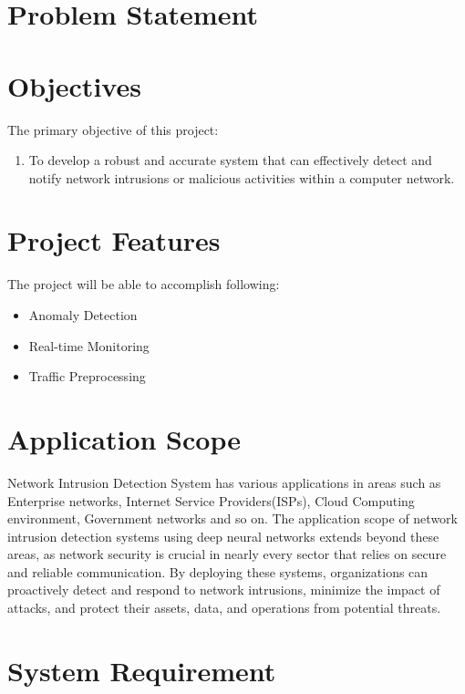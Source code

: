 \section{Problem Statement}
\vspace{-18pt}


\section{Objectives}
\vspace{-18pt}
The primary objective of this project:
\vspace{-18pt}
\begin{enumerate}[label=\roman*.]
\item To develop a robust and accurate system that can effectively detect and notify network intrusions or malicious activities within a computer network.
\end{enumerate}
\section{Project Features}
\vspace{-18pt}
The project will be able to accomplish following:
\vspace{-18pt}
\begin{itemize}
\item Anomaly Detection
\item Real-time Monitoring
\item Traffic Preprocessing
\end{itemize}
\section{Application Scope}
\vspace{-18pt}
Network Intrusion Detection System has various applications in areas such as Enterprise networks, Internet Service Providers(ISPs), Cloud Computing environment, Government networks and so on. The application scope of network intrusion detection systems using deep neural networks extends beyond these areas, as network security is crucial in nearly every sector that relies on secure and reliable communication. By deploying these systems, organizations can proactively detect and respond to network intrusions, minimize the impact of attacks, and protect their assets, data, and operations from potential threats.
\section{System Requirement}
\vspace{-18pt}
